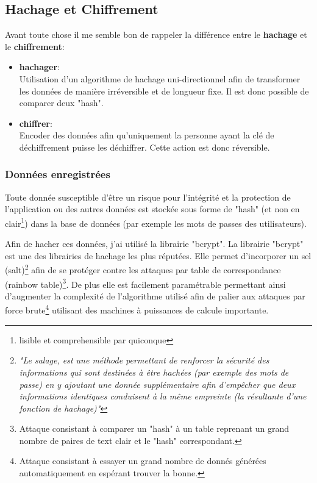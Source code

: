 \newpage

\subsection{Hachage et Chiffrement}

Avant toute chose il me semble bon de rappeler la différence entre le \textbf{hachage} et le \textbf{chiffrement}: 
\begin{itemize}
  \item \textbf{hachager}: \\ Utilisation d'un algorithme de hachage uni-directionnel afin de transformer les données de manière irréversible et de longueur fixe. Il est donc possible de comparer deux "hash".
  \item \textbf{chiffrer}: \\ Encoder des données afin qu'uniquement la personne ayant la clé de déchiffrement puisse les déchiffrer. Cette action est donc réversible.
\end{itemize}

\subsubsection{Données enregistrées}
Toute donnée susceptible d'être un risque pour l'intégrité et la protection de l'application ou des autres données est stockée sous forme de "hash" (et non en clair\footnote{lisible et comprehensible par quiconque}) dans la base de données (par exemple les mots de passes des utilisateurs). 

\newpara

Afin de hacher ces données, j'ai utilisé la librairie "bcrypt". La librairie "bcrypt" est une des librairies de hachage les plus réputées. Elle permet d'incorporer un sel (salt)\footnote{\textit{"Le salage, est une méthode permettant de renforcer la sécurité des informations qui sont destinées à être hachées (par exemple des mots de passe) en y ajoutant une donnée supplémentaire afin d’empêcher que deux informations identiques conduisent à la même empreinte (la résultante d’une fonction de hachage)"}\cite{Salt}} afin de se protéger contre les attaques par table de correspondance (rainbow table)\footnote{Attaque consistant à comparer un "hash" à un table reprenant un grand nombre de paires de text clair et le "hash" correspondant.}. De plus elle est facilement paramétrable permettant ainsi d'augmenter la complexité de l'algorithme utilisé afin de palier aux attaques par force brute\footnote{Attaque consistant à essayer un grand nombre de donnés générées automatiquement en espérant trouver la bonne.} utilisant des machines à puissances de calcule importante. 

